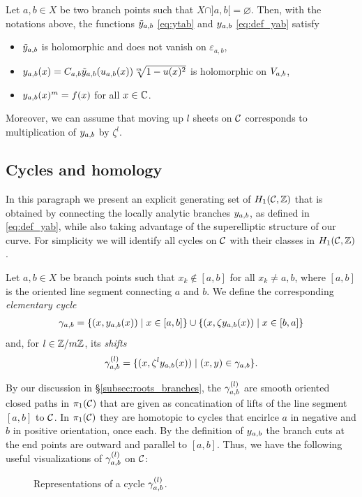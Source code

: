 \documentclass[main.tex]{subfiles}
\begin{document}
  \begin{prop}
      Let $a,b\in X$ be two branch points such that $X\cap]a,b[=\varnothing$.
      Then, with the notations above, the functions
      $\tilde{y}_{a,b}$ \eqref{eq:ytab} and $y_{a,b}$ \eqref{eq:def_yab}
      satisfy
     \begin{itemize}
         \item $\tilde{y}_{a,b}$ is holomorphic and does not vanish on $ε_{a,b}$,
         \item $y_{a,b}(x) = C_{a,b} \tilde{y}_{a,b}(u_{a,b}(x)) \sqrt[m]{1-u(x)^2}$ is holomorphic
         on $V_{a,b}$,
         \item $y_{a,b}(x)^m = f(x)$ for all $x\in\mathbb{C}$.
     \end{itemize}
     Moreover, we can assume that moving up $l$ sheets on $\mathcal{C}$
     corresponds to multiplication of $y_{a,b}$ by $\zeta^l$.
 \end{prop}


  \subsection{Cycles and homology}\label{subsec:cycles_homo}

   In this paragraph we present an explicit generating set of $H_1(\mathcal{C},\mathbb{Z})$ that is obtained by connecting the locally analytic branches $y_{a,b}$, as defined in \eqref{eq:def_yab},
   while also taking advantage of the superelliptic structure of our curve.
   For simplicity we will identify all cycles on $\mathcal{C}$ with their classes in $H_1(\mathcal{C},\mathbb{Z})$.

   \begin{defn}\label{def:elem_cycle}
   Let $a, b \in X$ be branch points such that $x_k \not\in [a,b]$ for all $x_k \ne a,b$, where  $[a,b]$ is the oriented line segment connecting $a$ and $b$.
   We define the corresponding \textit{elementary cycle}
   \begin{align}
    \gamma_{a,b} = \{  (x,y_{a,b}(x))  \mid  x \in [a,b]  \} \cup \{ (x,\zeta  y_{a,b}(x))  \mid  x \in [b,a]  \}
   \end{align}
   and, for $l \in \mathbb{Z}/m\mathbb{Z}$, its \textit{shifts}
   \begin{align}
    \gamma_{a,b}^{(l)} = \{  (x,\zeta^l y_{a,b}(x))  \mid  (x,y) \in \gamma_{a,b}  \}.
   \end{align}
    \end{defn}

   By our discussion in \S \ref{subsec:roots_branches}, the $\gamma_{a,b}^{(l)}$ are smooth oriented closed paths in $\pi_1(\mathcal{C})$ that are given as concatination of
   lifts of the line segment $[a,b]$ to $\mathcal{C}$. \abstand
   In $\pi_1(\mathcal{C})$
   they are homotopic to cycles that encirlce  $a$ in negative and $b$ in positive orientation, once each.
   By the definition of $y_{a,b}$ the branch cuts at the end points are outward and parallel to $[a,b]$. Thus, we have the following useful visualizations of $\gamma_{a,b}^{(l)}$ on $\mathcal{C}$:
   \begin{figure}[H]
      \begin{center}
   
      \end{center}
    \caption{Representations of a cycle $\gamma_{a,b}^{(l)}$.}
    \label{fig:elem_cycle}
\end{figure}
\end{document}
